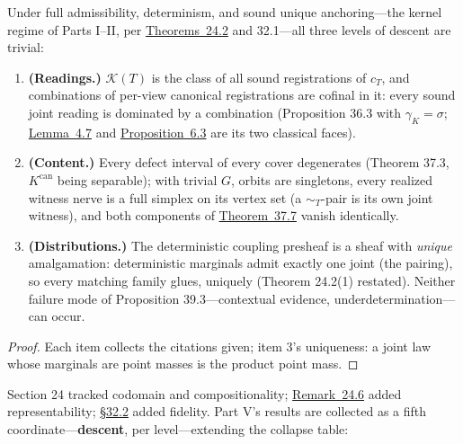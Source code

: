 \begin{thmplain}

Under full admissibility, determinism, and sound unique anchoring---\hspace{0pt}the kernel regime of Parts I--II, per \hyperlink{stmt:24.2}{Theorems~24.2} and 32.1---\hspace{0pt}all three levels of descent are trivial:

\begin{enumerate}
\def\labelenumi{\arabic{enumi}.}
\tightlist
\item
  \textbf{(Readings.)} \(\mathcal{K}(T)\) is the class of all sound registrations of \(c_T\), and combinations of per-view canonical registrations are cofinal in it: every sound joint reading is dominated by a combination (Proposition 36.3 with \(\gamma_K = \sigma\); \hyperlink{stmt:4.7}{Lemma~4.7} and \hyperlink{stmt:6.3}{Proposition~6.3} are its two classical faces).
\item
  \textbf{(Content.)} Every defect interval of every cover degenerates (Theorem 37.3, \(K^{\mathrm{can}}\) being separable); with trivial \(G\), orbits are singletons, every realized witness nerve is a full simplex on its vertex set (a \(\sim_T\)-pair is its own joint witness), and both components of \hyperlink{stmt:37.7}{Theorem~37.7} vanish identically.
\item
  \textbf{(Distributions.)} The deterministic coupling presheaf is a sheaf with \emph{unique} amalgamation: deterministic marginals admit exactly one joint (the pairing), so every matching family glues, uniquely (Theorem 24.2(1) restated). Neither failure mode of Proposition 39.3---\hspace{0pt}contextual evidence, underdetermination---\hspace{0pt}can occur.
\end{enumerate}
\end{thmplain}

\begin{proof}

Each item collects the citations given; item 3's uniqueness: a joint law whose marginals are point masses is the product point mass.
\end{proof}


Section 24 tracked codomain and compositionality; \hyperlink{stmt:24.6}{Remark~24.6} added representability; \hyperlink{sec:32.2}{§32.2} added fidelity. Part V's results are collected as a fifth coordinate---\hspace{0pt}\textbf{descent}, per level---\hspace{0pt}extending the collapse table:

